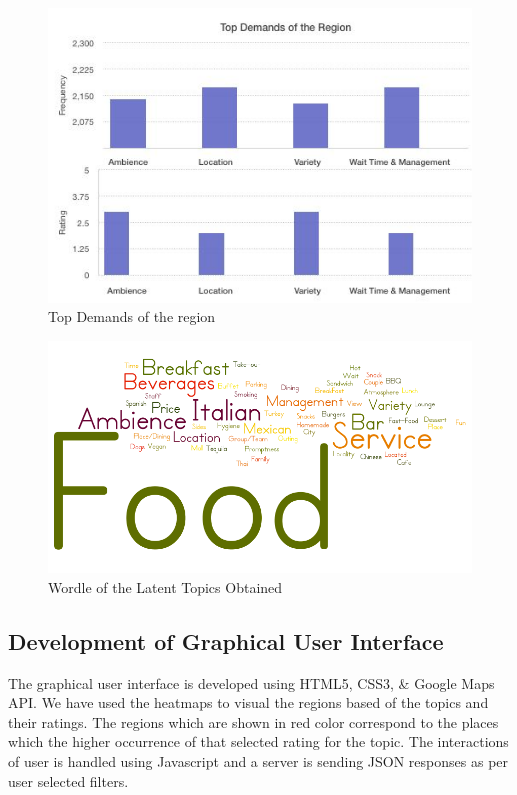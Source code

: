 \documentclass[12pt]{article} %
\begin{document}
\begin{figure}[h]
\begin{center}
\includegraphics[width=5in]{eval.jpg}
\caption{Top Demands of the region}
\end{center}
\end{figure}

\newpage

\begin{figure}[h]
\begin{center}
\includegraphics[width=6in]{wordle.png}
\caption{Wordle of the Latent Topics Obtained}
\end{center}
\end{figure}

\subsection{Development of Graphical User Interface}

The graphical user interface is developed using HTML5, CSS3, \& Google Maps API. We have used the heatmaps to visual the regions based of the topics and their ratings. The regions which are shown in red color correspond to the places which the higher occurrence of that selected rating for the topic. The interactions of user is handled using Javascript and a server is sending JSON responses as per user selected filters. 
\end{document}

